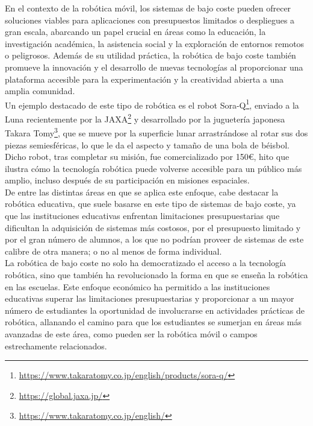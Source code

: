 En el contexto de la robótica móvil, los sistemas de bajo coste pueden ofrecer
soluciones viables para aplicaciones con presupuestos limitados o despliegues a
gran escala, abarcando un papel crucial en áreas como la educación, la
investigación académica, la asistencia social y la exploración de entornos
remotos o peligrosos.
Además de su utilidad práctica, la robótica de bajo coste también promueve la
innovación y el desarrollo de nuevas tecnologías al proporcionar una plataforma
accesible para la experimentación y la creatividad abierta a una amplia
comunidad.
\\

Un ejemplo destacado de este tipo de robótica es el robot Sora-Q\footnote{
\url{https://www.takaratomy.co.jp/english/products/sora-q/}}, enviado a la Luna
recientemente por la JAXA\footnote{\url{https://global.jaxa.jp/}} y desarrollado
por la juguetería japonesa Takara Tomy\footnote{
\url{https://www.takaratomy.co.jp/english/}}, que se mueve por la superficie
lunar arrastrándose al rotar sus dos piezas semiesféricas, lo que le da el
aspecto y tamaño de una bola de béisbol.
Dicho robot, tras completar su misión, fue comercializado por 150\euro, hito que
ilustra cómo la tecnología robótica puede volverse accesible para un público más
amplio, incluso después de su participación en misiones espaciales.
\\

De entre las distintas áreas en que se aplica este enfoque, cabe destacar la
robótica educativa, que suele basarse en este tipo de sistemas de bajo coste, ya
que las instituciones educativas enfrentan limitaciones presupuestarias que
dificultan la adquisición de sistemas más costosos, por el presupuesto limitado
y por el gran número de alumnos, a los que no podrían proveer de sistemas de
este calibre de otra manera; o no al menos de forma individual.
\\

La robótica de bajo coste no solo ha democratizado el acceso a la tecnología
robótica, sino que también ha revolucionado la forma en que se enseña la
robótica en las escuelas.
Este enfoque económico ha permitido a las instituciones educativas superar las
limitaciones presupuestarias y proporcionar a un mayor número de estudiantes la
oportunidad de involucrarse en actividades prácticas de robótica, allanando el
camino para que los estudiantes se sumerjan en áreas más avanzadas de este área,
como pueden ser la robótica móvil o campos estrechamente relacionados.



